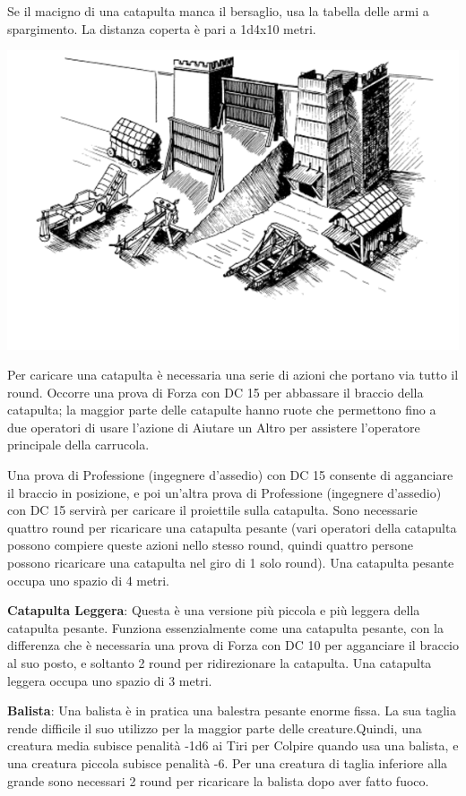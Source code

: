 \documentclass[a4paper,twoside,openany]{book}
\begin{document}
\begin{multicols}{2}
Se il macigno di una catapulta manca il bersaglio, usa la tabella delle armi a spargimento. La distanza coperta è pari a 1d4x10 metri.


\medskip

\begin{center}
\includegraphics[width=0.85\linewidth]{immagini/armidaassedio.png}
\end{center}

Per caricare una catapulta è necessaria una serie di azioni che portano via tutto il round. Occorre una prova di Forza con DC 15 per abbassare il braccio della catapulta; la maggior parte delle catapulte hanno ruote che permettono fino a due operatori di usare l'azione di Aiutare un Altro per assistere l'operatore principale della carrucola.

Una prova di Professione (ingegnere d'assedio) con DC 15 consente di agganciare il braccio in posizione, e poi un'altra prova di Professione (ingegnere d'assedio) con DC 15 servirà per caricare il proiettile sulla catapulta. Sono necessarie quattro round per ricaricare una catapulta pesante (vari operatori della catapulta possono compiere queste azioni nello stesso round, quindi quattro persone possono ricaricare una catapulta nel giro di 1 solo round). Una catapulta pesante occupa uno spazio di 4 metri.

\textbf{Catapulta Leggera}: Questa è una versione più piccola e più leggera della catapulta pesante. Funziona essenzialmente come una catapulta pesante, con la differenza che è necessaria una prova di Forza con DC 10 per agganciare il braccio al suo posto, e soltanto 2 round per ridirezionare la catapulta. Una catapulta leggera occupa uno spazio di 3 metri.

\textbf{Balista}: Una balista è in pratica una balestra pesante enorme fissa. La sua taglia rende difficile il suo utilizzo per la maggior parte delle creature.Quindi, una creatura media subisce penalità -1d6 ai Tiri per Colpire quando usa una balista, e una creatura piccola subisce penalità -6. Per una creatura di taglia inferiore alla grande sono necessari 2 round per ricaricare la balista dopo aver fatto fuoco.


\end{multicols}
\end{document}
